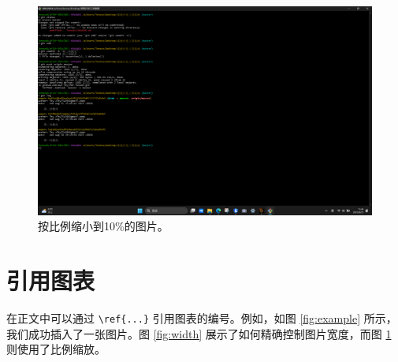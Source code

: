 \documentclass{article}
\begin{document}
\begin{figure}[h]
    \centering
    \includegraphics[scale=0.1]{example-image-b.png} %
    \caption{按比例缩小到10\%的图片。}
    \label{fig:scale}
\end{figure}

\section{引用图表}
在正文中可以通过 \texttt{\textbackslash ref\{...\}} 引用图表的编号。例如，如图 \ref{fig:example} 所示，我们成功插入了一张图片。图 \ref{fig:width} 展示了如何精确控制图片宽度，而图 \ref{fig:scale} 则使用了比例缩放。

\end{document}

